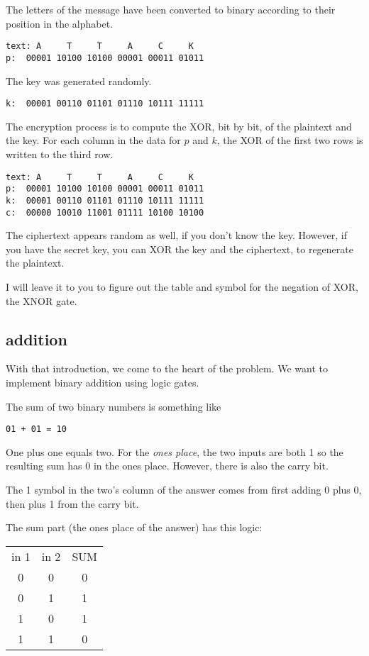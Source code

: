 \documentclass[11pt, oneside]{article}
\begin{document}
The letters of the message have been converted to binary according to their position in the alphabet.
\begin{verbatim}
text: A     T     T     A     C     K
p:  00001 10100 10100 00001 00011 01011
\end{verbatim}

The key was generated randomly.  
\begin{verbatim}
k:  00001 00110 01101 01110 10111 11111
\end{verbatim}

The encryption process is to compute the XOR, bit by bit, of the plaintext and the key.  For each column in the data for $p$ and $k$, the XOR of the first two rows is written to the third row.

\begin{verbatim}
text: A     T     T     A     C     K
p:  00001 10100 10100 00001 00011 01011
k:  00001 00110 01101 01110 10111 11111
c:  00000 10010 11001 01111 10100 10100
\end{verbatim}

The ciphertext appears random as well, if you don't know the key.  However, if you have the secret key, you can XOR the key and the ciphertext, to regenerate the plaintext.

I will leave it to you to figure out the table and symbol for the negation of XOR, the XNOR gate.

\subsection*{addition}

With that introduction, we come to the heart of the problem.  We want to implement binary addition using logic gates.  

The sum of two binary numbers is something like

\begin{verbatim}
01 + 01 = 10
\end{verbatim}

One plus one equals two.  For the \emph{ones place}, the two inputs are both 1 so the resulting sum has 0 in the ones place.  However, there is also the carry bit.

The 1 symbol in the two's column of the answer comes from first adding 0 plus 0, then plus 1 from the carry bit.

The sum part (the ones place of the answer) has this logic:

\begin{center}
\begin{tabular}{ |c|c|c| } 
\hline
 in 1 & in 2 & SUM \\ 
 0 & 0 & 0 \\ 
 0 & 1 & 1  \\ 
 1 & 0 & 1  \\  
 1 & 1 & 0  \\  
\hline
\end{tabular}
\end{center}
\end{document}
